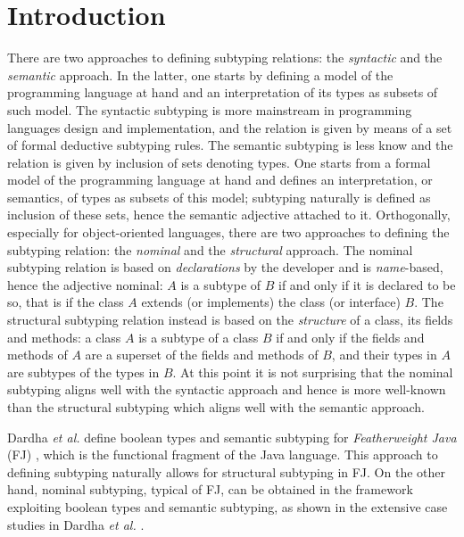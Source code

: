 \documentclass[runningheads]{llncs}
\begin{document}
\section{Introduction}
There are two approaches to defining subtyping relations: the \emph{syntactic} and the \emph{semantic} approach.
In the latter, one starts by defining a model of the programming language at hand and an interpretation of its types as subsets of such model.
The syntactic subtyping is more mainstream in programming languages design and implementation, and the relation is given by means of a set of formal deductive subtyping rules.
The semantic subtyping is less know and the relation is given by inclusion of sets denoting types. One starts from a formal model of the programming language at hand and defines an interpretation, or semantics, of types as subsets of this model; subtyping naturally is defined as inclusion of these sets, hence the semantic adjective attached to it.
Orthogonally, especially for object-oriented languages, there are two approaches to defining the subtyping relation: the \emph{nominal} and the \emph{structural} approach.
The nominal subtyping relation is based on \emph{declarations} by the developer and is \emph{name}-based, hence the adjective nominal: $A$ is a subtype of $B$ if and only if it is declared to be so, that is if the class $A$ extends (or implements) the class (or interface) $B$.
The structural subtyping relation instead is based on the \emph{structure} of a class, its fields and methods: a class $A$ is a subtype of a class $B$ if and only if the fields and methods of $A$ are a superset of the fields and methods of $B$, and their types in $A$ are subtypes of the types in $B$.
At this point it is not surprising that the nominal subtyping aligns well with the syntactic approach and hence is more well-known than the structural subtyping which aligns well with the semantic approach.

Dardha \emph{et al.} \cite{Dardha2013,Dardha2017} define boolean types and semantic subtyping for \emph{Featherweight Java} (FJ) \cite{featherweight}, which is the functional fragment of the Java language.
This approach to defining subtyping naturally allows for structural subtyping in FJ.
On the other hand, nominal subtyping, typical of FJ, can be obtained in the framework exploiting boolean types and semantic subtyping, as shown in the extensive case studies in Dardha \emph{et al.} \cite[\S 8.4]{Dardha2017}.
\end{document}
